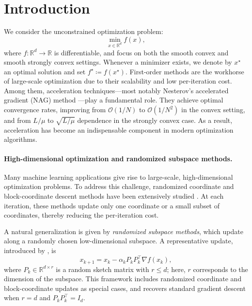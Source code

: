 \documentclass[10pt]{article}
\begin{document}
\section{Introduction}
\label{sec:introduction}

We consider the unconstrained optimization problem:
\begin{equation}
    \min_{x \in \mathbb{R}^d} f(x),
    \label{eq:main-problem}
\end{equation}
where \(f:\mathbb{R}^d \to \mathbb{R}\) is differentiable, and focus on both the smooth convex and smooth strongly convex settings.
Whenever a minimizer exists, we denote by \(x^\star\) an optimal solution and set
\(f^\star \coloneqq f(x^\star)\).
First-order methods are the workhorse of large-scale optimization due to their scalability and low per-iteration cost.
Among them, acceleration techniques---most notably Nesterov's accelerated gradient (NAG) method \cite{nesterov1983,nesterov2004intro}---play a fundamental role.
They achieve optimal convergence rates, improving from \(\mathcal{O}(1/N)\) to \(\mathcal{O}(1/N^2)\) in the convex setting, and from \(L/\mu\) to \(\sqrt{L/\mu}\) dependence in the strongly convex case.
As a result, acceleration has become an indispensable component in modern optimization algorithms.

\paragraph{High-dimensional optimization and randomized subspace methods.}
Many machine learning applications give rise to large-scale, high-dimensional optimization problems.
To address this challenge, randomized coordinate and block-coordinate descent methods have been extensively studied
\cite{nesterov2012,richtarik2014,luxiao2015,wright2015}.
At each iteration, these methods update only one coordinate or a small subset of coordinates, thereby reducing the per-iteration cost.

A natural generalization is given by \emph{randomized subspace methods}, which update along a randomly chosen low-dimensional subspace.
A representative update, introduced by \cite{kozak2021}, is
\begin{equation}
x_{k+1} = x_k - \alpha_k P_k P_k^\top \nabla f(x_k),
\end{equation}
where \(P_k \in \mathbb{R}^{d \times r}\) is a random sketch matrix with \(r \le d\); here, $r$ corresponds to the dimension of the subspace.
This framework includes randomized coordinate and block-coordinate updates as
special cases, and recovers standard gradient descent when \(r=d\) and
\(P_kP_k^\top=I_d\).
\end{document}

